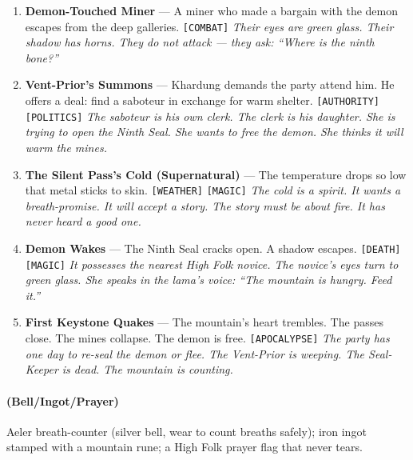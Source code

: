 \begin{enumerate}
  \hfill \textit{The mountain spirits are offended. The next pass they cross will be twice as long. The snow will fall upward.}
\item \textbf{Demon-Touched Miner} --- A miner who made a bargain with the demon escapes from the deep galleries. \texttt{[COMBAT]}
  \hfill \textit{Their eyes are green glass. Their shadow has horns. They do not attack --- they ask: ``Where is the ninth bone?''}
\item[J] \textbf{Vent-Prior's Summons} --- Khardung demands the party attend him. He offers a deal: find a saboteur in exchange for warm shelter. \texttt{[AUTHORITY]} \texttt{[POLITICS]}
  \hfill \textit{The saboteur is his own clerk. The clerk is his daughter. She is trying to open the Ninth Seal. She wants to free the demon. She thinks it will warm the mines.}
\item[Q] \textbf{The Silent Pass's Cold (Supernatural)} --- The temperature drops so low that metal sticks to skin. \texttt{[WEATHER]} \texttt{[MAGIC]}
  \hfill \textit{The cold is a spirit. It wants a breath-promise. It will accept a story. The story must be about fire. It has never heard a good one.}
\item[K] \textbf{Demon Wakes} --- The Ninth Seal cracks open. A shadow escapes. \texttt{[DEATH]} \texttt{[MAGIC]}
  \hfill \textit{It possesses the nearest High Folk novice. The novice's eyes turn to green glass. She speaks in the lama's voice: ``The mountain is hungry. Feed it.''}
\item[A] \textbf{First Keystone Quakes} --- The mountain's heart trembles. The passes close. The mines collapse. The demon is free. \texttt{[APOCALYPSE]}
  \hfill \textit{The party has one day to re-seal the demon or flee. The Vent-Prior is weeping. The Seal-Keeper is dead. The mountain is counting.}
\end{enumerate}

\paragraph*{(Bell/Ingot/Prayer)} Aeler breath-counter (silver bell, wear to count breaths safely); iron ingot stamped with a mountain rune; a High Folk prayer flag that never tears.

